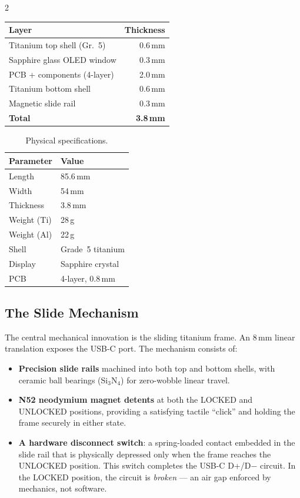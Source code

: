 \documentclass[11pt,a4paper]{article}
\begin{document}
\begin{multicols}{2}
\begin{center}
\small
\begin{tabular}{lr}
  \toprule
  \textbf{Layer} & \textbf{Thickness} \\
  \midrule
  Titanium top shell (Gr.~5) & 0.6\,mm \\
  Sapphire glass OLED window   & 0.3\,mm \\
  PCB + components (4-layer)   & 2.0\,mm \\
  Titanium bottom shell        & 0.6\,mm \\
  Magnetic slide rail           & 0.3\,mm \\
  \midrule
  \textbf{Total}               & \textbf{3.8\,mm} \\
  \bottomrule
\end{tabular}
\end{center}

\begin{table}[H]
  \centering
  \small
  \caption{Physical specifications.}
  \label{tab:dimensions}
  \begin{tabular}{ll}
    \toprule
    \textbf{Parameter} & \textbf{Value} \\
    \midrule
    Length  & 85.6\,mm \\
    Width   & 54\,mm \\
    Thickness & 3.8\,mm \\
    Weight (Ti) & 28\,g \\
    Weight (Al) & 22\,g \\
    Shell & Grade~5 titanium \\
    Display & Sapphire crystal \\
    PCB & 4-layer, 0.8\,mm \\
    \bottomrule
  \end{tabular}
\end{table}

\subsection{The Slide Mechanism}

The central mechanical innovation is the sliding titanium frame. An 8\,mm
linear translation exposes the USB-C port. The mechanism consists of:

\begin{itemize}[leftmargin=1.2em,itemsep=2pt]
  \item \textbf{Precision slide rails} machined into both top and bottom
    shells, with ceramic ball bearings (Si$_3$N$_4$) for zero-wobble
    linear travel.
  \item \textbf{N52 neodymium magnet detents} at both the LOCKED and
    UNLOCKED positions, providing a satisfying tactile ``click'' and
    holding the frame securely in either state.
  \item \textbf{A hardware disconnect switch}: a spring-loaded contact
    embedded in the slide rail that is physically depressed only when the
    frame reaches the UNLOCKED position. This switch completes the
    USB-C D+/D$-$ circuit. In the LOCKED position, the circuit is
    \emph{broken} --- an air gap enforced by mechanics, not software.
\end{itemize}


\end{multicols}
\end{document}
